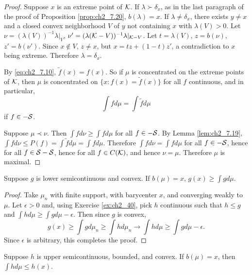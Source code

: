 \begin{proof}
Suppose $x$ is an extreme point of $\mathcal{K}$. If $\lambda\succ\delta_x$, as in the last paragraph of the proof of Proposition \ref{prop:ch2_7.20}, $b(\lambda) = x$. If $\lambda \neq \delta_x$, there exists $y \neq x$ and a closed convex neighborhood $V$ of $y$ not containing $x$ with $\lambda(V) > 0$. Let $\nu = (\lambda(V))^{-1}\lambda|_V$, $\nu' = (\lambda(\mathcal{K} - V))^{-1}\lambda|_{\mathcal{K}-V}$. Let $t = \lambda(V)$, $z = b(\nu)$, $z' = b(\nu')$. Since $x \notin V$, $z \neq x$, but $x = tz+(1-t)z'$, a contradiction to $x$ being extreme. Therefore $\lambda = \delta_x$.

By \eqref{eq:ch2_7.10}, $\widetilde{f}(x) = f(x)$. So if $\mu$ is concentrated on the extreme points of $\mathcal{K}$, then $\mu$ is concentrated on $\{x : f(x) = \widetilde{f}(x)\}$ for all $f$ continuous, and in particular,
\begin{equation}\label{eq:ch2_7.11}
    \int fd\mu = \int \widetilde{f}d\mu
\end{equation}
if $f \in -\mathcal{S}$.


Suppose $\mu\prec\nu$. Then $\int fd\nu \geq \int fd\mu$ for all $f \in -\mathcal{S}$. By Lemma \ref{lem:ch2_7.19}, $\int fd\nu \leq P(f) = \int \widetilde{f}d\mu = \int fd\mu$. Therefore $\int fd\nu = \int fd\mu$ for all $f \in -\mathcal{S}$, hence for all $f \in \mathcal{S} - \mathcal{S}$, hence for all $f \in C(\mathcal{K})$, and hence $\nu = \mu$. Therefore $\mu$ is maximal.
\end{proof}

\begin{lemma}\label{lem:ch2_7.22}
Suppose $g$ is lower semicontinuous and convex. If $b(\mu) = x$, $g(x) \geq \int gd\mu$.
\end{lemma}

\begin{proof}
Take $\mu_n$ with finite support, with barycenter $x$, and converging weakly to $\mu$. Let $\epsilon > 0$ and, using Exercise \ref{ex:ch2_40}, pick $h$ continuous such that $h \leq g$ and $\int hd\mu \geq \int gd\mu - \epsilon$. Then since $g$ is convex,
\[
    g(x) \geq \int gd\mu_n \geq \int hd\mu_n \to \int hd\mu \geq \int gd\mu - \epsilon.
\]
Since $\epsilon$ is arbitrary, this completes the proof.
\end{proof}

\begin{lemma}\label{lem:ch2_7.23}
Suppose $h$ is upper semicontinuous, bounded, and convex. If $b(\mu) = x$, then $\int hd\mu \leq h(x)$.
\end{lemma}

